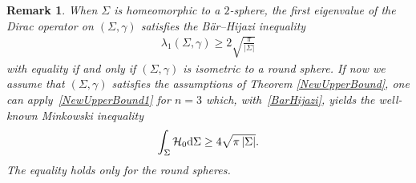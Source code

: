 \documentclass[pdftex]{sigma}
\numberwithin{equation}{section}
\newtheorem{Remark}[Theorem]{Remark}
\begin{document}
\begin{Remark}\label{MinkowskiInequality-EuclideanSpace}
When $\Sigma$ is homeomorphic to a $2$-sphere, the first eigenvalue of the Dirac operator on $(\Sigma,\gamma)$ satisfies the B\"ar--Hijazi inequality~\cite{Bar3,Hijazi2,Hijazi1}
\begin{gather}\label{BarHijazi}
\lambda_1(\Sigma,\gamma)\geq 2\sqrt{\frac{\pi}{|\Sigma|}}
\end{gather}
with equality if and only if $(\Sigma,\gamma)$ is isometric to a round sphere. If now we assume that $(\Sigma,\gamma)$ satisfies the assumptions of Theorem \ref{NewUpperBound}, one can apply~\eqref{NewUpperBound1} for $n=3$ which, with~\eqref{BarHijazi}, yields the well-known Minkowski inequality
\begin{gather*}
\int_\Sigma \mathcal{H}_0{\rm d}\Sigma\geq 4\sqrt{\pi\,|\Sigma|}.
\end{gather*}
The equality holds only for the round spheres.
\end{Remark}
\end{document}
